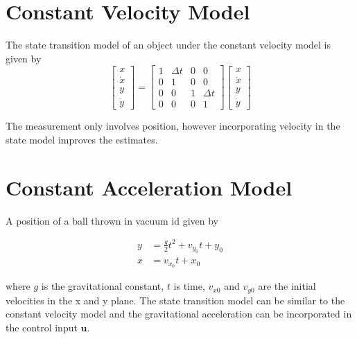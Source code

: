 \documentclass[10pt, a4paper]{article}
\begin{document}
\section{Constant Velocity Model}
The state transition model of an object under the constant velocity model is given by
\[
\begin{bmatrix}
x \\
\dot{x} \\
y \\
\dot{y}
\end{bmatrix}
= 
\begin{bmatrix}
1 & \Delta t & 0 & 0 \\
0 & 1 & 0 & 0 \\
0 & 0 & 1 & \Delta t \\
0 & 0 & 0 & 1
\end{bmatrix}
\begin{bmatrix}
x \\
\dot{x} \\
y \\
\dot{y}
\end{bmatrix}
\]

The measurement only involves position, however incorporating velocity in the state model improves the estimates.

\section{Constant Acceleration Model}
A position of a ball thrown in vacuum id given by

\begin{align}
    y &= \frac{g}{2} t^2 + v_{y_0}t + y_0 \\
    x &= v_{x_0}t + x_0
\end{align}

where $g$ is the gravitational constant, $t$ is time, $v_{x0}$ and $v_{y0}$ are the initial velocities in the x and y plane.
The state transition model can be similar to the constant velocity model and the gravitational acceleration can be incorporated in the control input $\mathbf{u}$.

\printbibliography
\end{document}
